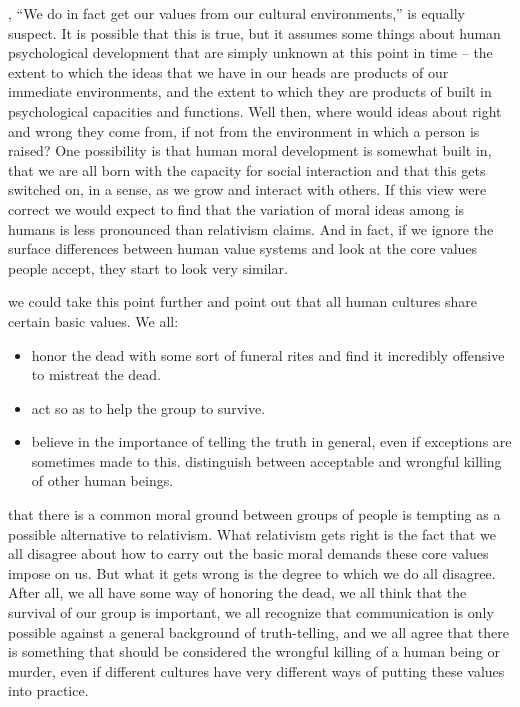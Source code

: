 \documentclass[justified]{tufte-book}
\providecommand{\tightlist}{%
  \setlength{\itemsep}{0pt}\setlength{\parskip}{0pt}}
\begin{document}
, ``We do in fact get our values from our cultural environments,'' is equally suspect. It is possible that this is true, but it assumes some things about human psychological development that are simply unknown at this point in time -- the extent to which the ideas that we have in our heads are products of our immediate environments, and the extent to which they are products of built in psychological capacities and functions. Well then, where would ideas about right and wrong they come from, if not from the environment in which a person is raised? One possibility is that human moral development is somewhat built in, that we are all born with the capacity for social interaction and that this gets switched on, in a sense, as we grow and interact with others. If this view were correct we would expect to find that the variation of moral ideas among is humans is less pronounced than relativism claims. And in fact, if we ignore the surface differences between human value systems and look at the core values people accept, they start to look very similar.

 we could take this point further and point out that all human cultures share certain basic values. We all:

\begin{itemize}
\tightlist
\item
  honor the dead with some sort of funeral rites and find it incredibly offensive to mistreat the dead.
\item
  act so as to help the group to survive.
\item
  believe in the importance of telling the truth in general, even if exceptions are sometimes made to this.
  distinguish between acceptable and wrongful killing of other human beings.
\end{itemize}

 that there is a common moral ground between groups of people is tempting as a possible alternative to relativism. What relativism gets right is the fact that we all disagree about how to carry out the basic moral demands these core values impose on us. But what it gets wrong is the degree to which we do all disagree. After all, we all have some way of honoring the dead, we all think that the survival of our group is important, we all recognize that communication is only possible against a general background of truth-telling, and we all agree that there is something that should be considered the wrongful killing of a human being or murder, even if different cultures have very different ways of putting these values into practice.
\end{document}
